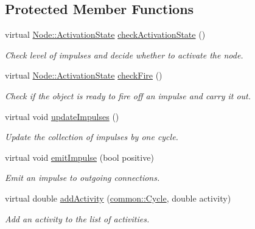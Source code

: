 \subsection*{\-Protected \-Member \-Functions}
\begin{DoxyCompactItemize}
\item 
virtual \hyperlink{classcryomesh_1_1components_1_1Node_a291becdd589b5bd338d5c0dd28199798}{\-Node\-::\-Activation\-State} \hyperlink{classcryomesh_1_1components_1_1Node_adeebae01197045204f1b9cda1ece3372}{check\-Activation\-State} ()
\begin{DoxyCompactList}\small\item\em \-Check level of impulses and decide whether to activate the node. \end{DoxyCompactList}\item 
virtual \hyperlink{classcryomesh_1_1components_1_1Node_a291becdd589b5bd338d5c0dd28199798}{\-Node\-::\-Activation\-State} \hyperlink{classcryomesh_1_1components_1_1Node_ac4f969b7c236a6e910031101879c8da3}{check\-Fire} ()
\begin{DoxyCompactList}\small\item\em \-Check if the object is ready to fire off an impulse and carry it out. \end{DoxyCompactList}\item 
virtual void \hyperlink{classcryomesh_1_1components_1_1Node_ade03584e4db3f8e1eeddc9ad371b4658}{update\-Impulses} ()
\begin{DoxyCompactList}\small\item\em \-Update the collection of impulses by one cycle. \end{DoxyCompactList}\item 
virtual void \hyperlink{classcryomesh_1_1components_1_1Node_a3323a7f7e9958b78552746ddf374c4fc}{emit\-Impulse} (bool positive)
\begin{DoxyCompactList}\small\item\em \-Emit an impulse to outgoing connections. \end{DoxyCompactList}\item 
virtual double \hyperlink{classcryomesh_1_1components_1_1Node_ab916e0beff2dcecd14c284dd63bd0585}{add\-Activity} (\hyperlink{classcryomesh_1_1common_1_1Cycle}{common\-::\-Cycle}, double activity)
\begin{DoxyCompactList}\small\item\em \-Add an activity to the list of activities. \end{DoxyCompactList}\item 

\end{DoxyCompactItemize}
